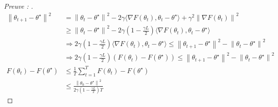 \begin{proof}[Preuve : ]
    \begin{align*}
        \left\| \theta _{t+1} - \theta ^\star  \right\| ^2 
            &= \left\| \theta _t - \theta ^\star  \right\| ^2 - 2 \gamma  \langle \nabla F(\theta _t), \theta _t - \theta ^\star \rangle + \gamma  ^2 \left\| \nabla F(\theta _t) \right\| ^2 \\
            &\geq  \left\| \theta _t - \theta ^\star  \right\| ^2 - 2 \gamma ( 1 - \frac{\gamma L }{2}) \langle \nabla F(\theta _t) , \theta _t - \theta ^\star \rangle  \\
            &\Rightarrow 2 \gamma (1 - \frac{\gamma L}{2}) \langle \nabla F(\theta _t) , \theta _t - \theta ^\star \rangle \leq  \left\| \theta _{t+1} - \theta ^\star  \right\| ^2 - \left\| \theta _t - \theta ^\star  \right\| ^2  \\
            &\Rightarrow 2 \gamma (1 - \frac{\gamma L }{2}) (F(\theta _t) - F(\theta ^\star )) \leq  \left\| \theta _{t+1} - \theta ^\star  \right\| ^2 - \left\| \theta _t - \theta ^\star  \right\| ^2  \\
        F(\theta _t) - F(\theta ^\star )
            &\leq \frac{1}{T}\sum_{t=1}^{T} F(\theta _t) - F(\theta ^\star ) \\
            &\leq \frac{\left\| \theta _0 - \theta ^\star  \right\| ^2}{ 2 \gamma (1 - \frac{\gamma L}{2}) T}
    \end{align*}
    
\end{proof}
